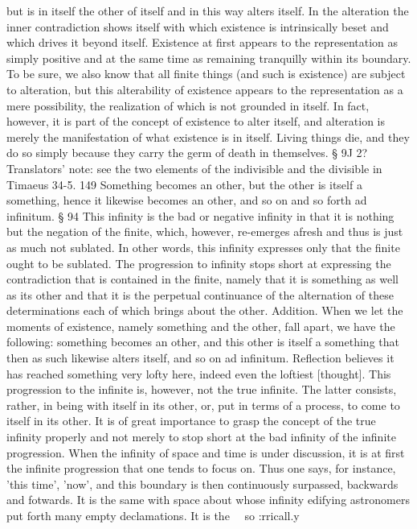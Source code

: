 but is in itself the other of itself and in this way alters itself. In the alteration
the inner contradiction shows itself with which existence is intrinsically beset and
which drives it beyond itself. Existence at first appears to the representation as
simply positive and at the same time as remaining tranquilly within its boundary.
To be sure, we also know that all finite things (and such is existence) are subject to
alteration, but this alterability of existence appears to the representation as a mere
possibility, the realization of which is not grounded in itself. In fact, however,
it is part of the concept of existence to alter itself, and alteration is merely the
manifestation of what existence is in itself. Living things die, and they do so
simply because they carry the germ of death in themselves. § 9J
2?
Translators' note: see the two elements of the indivisible and the divisible in Timaeus 34-5.
149
Something becomes an other, but the other is itself a something, hence it
likewise becomes an other, and so on and so forth ad infinitum.
§ 94
This infinity is the bad or negative infinity in that it is nothing but the
negation of the finite, which, however, re-emerges afresh and thus is just
as much not sublated. In other words, this infinity expresses only that
the finite ought to be sublated. The progression to infinity stops short at
expressing the contradiction that is contained in the finite, namely that
it is something as well as its other and that it is the perpetual continuance
of the alternation of these determinations each of which brings about the
other.
Addition. When we let the moments of existence, namely something and the
other, fall apart, we have the following: something becomes an other, and this
other is itself a something that then as such likewise alters itself, and so on ad
infinitum. Reflection believes it has reached something very lofty here, indeed
even the loftiest [thought]. This progression to the infinite is, however, not the
true infinite. The latter consists, rather, in being with itself in its other, or, put in
terms of a process, to come to itself in its other. It is of great importance to grasp
the concept of the true infinity properly and not merely to stop short at the bad
infinity of the infinite progression. When the infinity of space and time is under
discussion, it is at first the infinite progression that one tends to focus on. Thus
one says, for instance, 'this time', 'now', and this boundary is then continuously
surpassed, backwards and fotwards. It is the same with space about whose infinity
edifying astronomers put forth many empty declamations. It is the~ ~so :rricall.y
